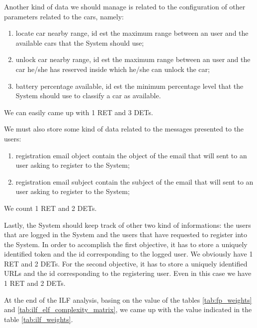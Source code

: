 Another kind of data we should manage is related to the configuration of other parameters related to the cars, namely:
\begin{enumerate}
	\item locate car nearby range, id est the maximum range between an user and the available cars that the System should use;
	\item unlock car nearby range, id est the maximum range between an user and the car he/she has reserved inside which he/she can unlock the car;
	\item battery percentage available, id est the minimum percentage level that the System should use to classify a car as available.
\end{enumerate}
We can easily came up with 1 RET and 3 DETs.
\smallskip

We must also store some kind of data related to the messages presented to the users:
\begin{enumerate}
	\item registration email object contain the object of the email that will sent to an user asking to register to the System;
	\item registration email subject contain the subject of the email that will sent to an user asking to register to the System;
\end{enumerate}
We count 1 RET and 2 DETs.
\smallskip

Lastly, the System should keep track of other two kind of informations: the users that are logged in the System and the users that have requested to register into the System. 
In order to accomplish the first objective, it has to store a uniquely identified token and the id corresponding to the logged user. We obviously have 1 RET and 2 DETs.
For the second objective, it has to store a uniquely identified URLs and the id corresponding to the registering user. Even in this case we have 1 RET and 2 DETs.
\bigskip

At the end of the ILF analysis, basing on the value of the tables \ref{tab:fp_weights} and \ref{tab:ilf_elf_complexity_matrix}, we came up with the value indicated in the table \ref{tab:ilf_weights}.

